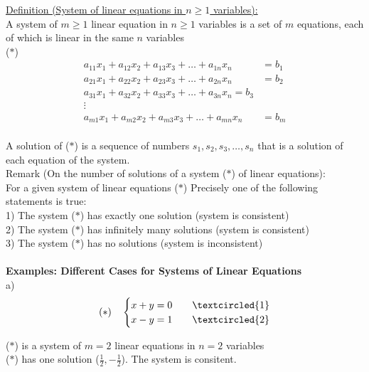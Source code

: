 \documentclass{jhwhw}
\begin{document}
\underline{Definition (System of linear equations in \(n \geq 1\) variables):}
\\

A system of \(m \geq 1\) linear equation in \(n \geq 1\) variables is a set of \(m\) equations, each of which is linear in the same \(n\) variables
\\

(\(\ast\)) \begin{align*} 
a_{11} x_1 + a_{12} x_2 + a_{13} x_3 + \ldots + a_{1n} x_n &= b_1\\
a_{21} x_1 + a_{22} x_2 + a_{23} x_3 + \ldots + a_{2n} x_n &= b_2\\
a_{31} x_1 + a_{32} x_2 + a_{33} x_3 + \ldots + a_{3n} x_n = b_3\\
\vdots\\
a_{m1} x_1 + a_{m2} x_2 + a_{m3} x_3 + \ldots + a_{mn} x_n &= b_m
\end{align*}
\\

A solution of (\(\ast\)) is a sequence of numbers \(s_1, s_2, s_3, \ldots, s_n\) that is a solution of each equation of the system.
\\

Remark (On the number of solutions of a system (\(\ast\)) of linear equations):
\\

For a given system of linear equations (\(\ast\)) Precisely one of the following statements is true:
\\

1) The system (\(\ast\)) has exactly one solution (system is consistent) \\
2) The system (\(\ast\)) has infinitely many solutions (system is consistent) \\
3) The system (\(\ast\)) has no solutions (system is inconsistent) \\
\\

\textbf{Examples: Different Cases for Systems of Linear Equations}
\\

a) \begin{align*}
    (\ast) \quad \begin{cases}
        x+y=0 & \quad \textcircled{1} \\ x-y=1 & \quad \textcircled{2}
    \end{cases}
\end{align*}

(\(\ast\)) is a system of \(m =2 \) linear equations in \(n=2\) variables \\
(\(\ast\)) has one solution (\(\frac{1}{2}, -\frac{1}{2}\)). The system is consitent.
\\ \\
\end{document}
